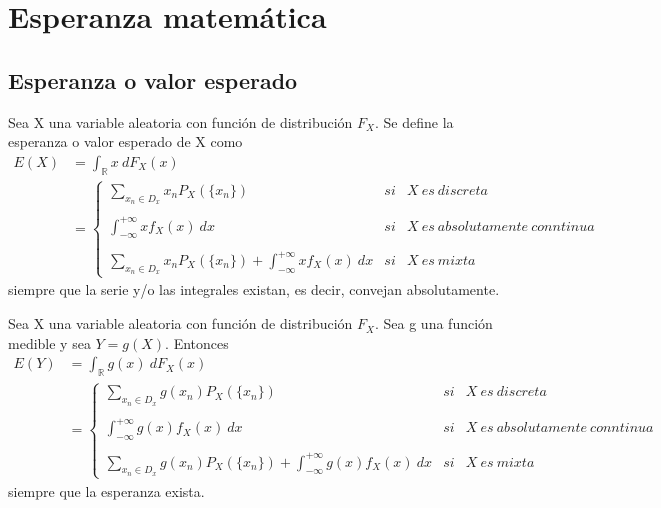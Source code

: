 \chapter{Esperanza matemática}

\section{Esperanza o valor esperado}

\begin{defi}
Sea X una variable aleatoria con función de distribución $F_X$. Se define la esperanza o valor esperado de X como
\begin{align*}
    E(X) &= \int_{\mathbb{R}}{x \ dF_X(x)} \\
        & =\left\{ \begin{array}{lcc}
            \sum_{x_n \in D_x}{x_nP_X(\{x_n\})} &  si  &  X \ es\  discreta\\ \\
            \int_{-\infty}^{+\infty}{xf_X(x) \ dx} &  si  & X \ es \ absolutamente \  conntinua\\ \\
            \sum_{x_n \in D_x}{x_nP_X(\{x_n\})} + \int_{-\infty}^{+\infty}{xf_X(x) \ dx} &  si  &  X \ es \ mixta
             \end{array}
        \right.
\end{align*}
siempre que la serie y/o las integrales existan, es decir, convejan absolutamente.
\end{defi}

\begin{prop}
Sea X una variable aleatoria con función de distribución $F_X$. Sea g una función medible y sea $Y = g(X)$. Entonces
\begin{align*}
    E(Y) &= \int_{\mathbb{R}}{g(x) \ dF_X(x)} \\
        & =\left\{ \begin{array}{lcc}
            \sum_{x_n \in D_x}{g(x_n)P_X(\{x_n\})} &  si  &  X \ es\  discreta\\ \\
            \int_{-\infty}^{+\infty}{g(x)f_X(x) \ dx} &  si  & X \ es \ absolutamente \  conntinua\\ \\
            \sum_{x_n \in D_x}{g(x_n)P_X(\{x_n\})} + \int_{-\infty}^{+\infty}{g(x)f_X(x) \ dx} &  si  &  X \ es \ mixta
             \end{array}
        \right.
\end{align*}
siempre que la esperanza exista.
\end{prop}

